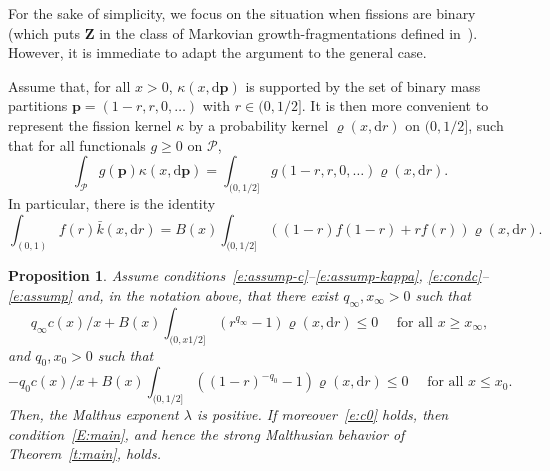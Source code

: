 \documentclass[11pt]{article}
\newtheorem{prop}[theo]{Proposition}
\theoremstyle{definition}
\providecommand{\mathof}[1]{\mathrm{#1}}
\numberwithin{equation}{section}
\numberwithin{figure}{section}
\numberwithin{table}{section}
\newcommand\Zz{\mathbf{Z}}
\newcommand\Pp{\mathcal{P}}
\newcommand\pp{\mathbf{p}}
\newcommand\dd{\mathof{d}}
\begin{document}
For the sake of simplicity, we focus on the situation when fissions are binary (which puts $\Zz$ in the class of Markovian growth-fragmentations defined in~\cite{BeGF}). However, it is immediate to adapt the argument to the general case.

Assume that, for all $x>0$, $\kappa(x, \dd \pp)$ is supported by the set of binary mass partitions $\pp=(1-r,r, 0, \ldots)$ with $r\in(0,1/2]$. It is then more convenient to represent the fission kernel $\kappa$ by a probability kernel $\varrho(x,\dd r)$ on $(0,1/2]$, such that for all functionals $g\geq 0$ on $\Pp$,
\[
\int_{\Pp} g(\pp) \kappa(x, \dd \pp) = \int_{(0,1/2]} g(1-r,r, 0, \ldots) \varrho(x,\dd r).
\]
In particular, there is the identity
\[
\int_{(0,1)} f(r) \bar k (x,\dd r)= B(x)\int_{(0,1/2]} ((1-r) f(1-r)+ r f(r)) \varrho(x,\dd r).
\]

\begin{prop}\label{P1}
Assume conditions~\eqref{e:assump-c}--\eqref{e:assump-kappa}, \eqref{e:condc}--\eqref{e:assump} and, in the notation above, that there exist $q_{\infty}, x_{\infty}>0$ such that
\begin{equation}\label{e:Brho1}
q_{\infty} c(x)/x + B(x) \int_{(0,x1/2]} (r^{q_{\infty}}-1) \varrho (x, \dd r) \leq 0 \quad\text{ for all }x\geq x_{\infty},
\end{equation}
and $q_0, x_0>0$ such that
\begin{equation}\label{e:Brho2}
-q_0 c(x)/x + B(x) \int_{(0,1/2]} ((1-r)^{-q_0}-1) \varrho(x,\dd r) \leq 0 \quad\text{ for all }x\leq x_0.
\end{equation}
Then, the Malthus exponent $\lambda$ is positive. If moreover~\eqref{e:c0} holds, then condition~\eqref{E:main}, and hence the strong Malthusian behavior of Theorem~\ref{t:main}, holds.
\end{prop}
\end{document}
